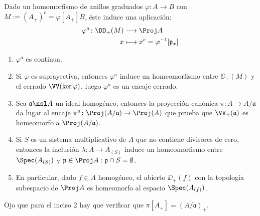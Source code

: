\begin{prop}\label{thm:proj_spec_morphisms}
	Dado un homomorfismo de anillos graduados $\varphi \colon A \to B$ con $M := (A_+)^e = \varphi[A_+]B$, éste induce una aplicación:
	\begin{align*}
		\varphi^a \colon \DD_+(M) &\longrightarrow \Proj A \\
		x &\longmapsto x^c = \varphi^{-1}[\mathfrak{p}_x]
	\end{align*}
	\begin{enumerate}
		\item $\varphi^a$ es continua.
		\item Si $\varphi$ es suprayectiva, entonces $\varphi^a$ induce un homeomorfismo entre $\DD_+(M)$ y el cerrado $\VV(\ker \varphi)$,
			luego $\varphi^a$ es un encaje cerrado.
		\item Sea $\mathfrak{a} \nsl A$ un ideal homogéneo, entonces la proyección canónica $\pi \colon A \to A/\mathfrak{a}$ da lugar al encaje
			$\pi^a \colon \Proj(A/\mathfrak{a}) \to \Proj(A)$ que prueba que $\VV_+(\mathfrak{a})$ es homeomorfo a $\Proj(A/\mathfrak{a})$.
		\item Si $S$ es un sistema multiplicativo de $A$ que no contiene divisores de cero, entonces la inclusión $\lambda \colon A \to A_{(S)}$
			induce un homeomorfismo entre $\Spec(A_{(S)})$ y ${ \mathfrak{p} \in \Proj A : \mathfrak{p} \cap S = \emptyset }$.
		\item En particular, dado $f \in A$ homogéneo, el abierto $\DD_+(f)$ con la topología subespacio de $\Proj A$
			es homeomorfo al espacio $\Spec(A_{(f)})$.
	\end{enumerate}
\end{prop}
Ojo que para el inciso 2 hay que verificar que $\pi[A_+] = (A/\mathfrak{a})_+$.

